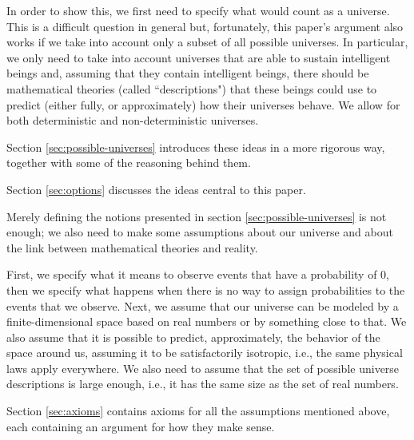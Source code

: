 \documentclass[a4paper
,draft
]{article}
\newcommand{\ghilimele}[1]{``#1"}
\begin{document}
In order to show this, we first need to specify what would count as a universe.
This is a difficult question in general but, fortunately, this paper's argument
also works if we take into account only a subset of all possible universes.
In particular, we only need to take into account universes that are able
to sustain intelligent beings
and, assuming that they contain intelligent beings, there should be mathematical
theories (called \ghilimele{descriptions}) that these beings could use to
predict (either fully, or approximately) how their universes behave.
We allow for both deterministic and non-deterministic universes.

Section \ref{sec:possible-universes} introduces these ideas in a more
rigorous way, together with some of the reasoning behind them.

Section \ref{sec:options} discusses the ideas central to this paper.

Merely defining the notions presented in section \ref{sec:possible-universes}
is not enough;
we also need to make some assumptions about our universe and about
the link between mathematical theories and reality.

First, we specify what it means to observe events that have a probability of $0$,
then we specify what happens when there is no way to assign probabilities to
the events that we observe.
Next, we assume that our universe can be modeled by a finite-dimensional
space based on real numbers or by something close to that.
We also assume that it is possible to predict, approximately, the behavior of the space
around us, assuming it to be satisfactorily isotropic,
i.e., the same physical laws apply everywhere.
We also need to assume that the set of possible universe descriptions
is large enough, i.e., it has the same size as the set of real numbers.

Section \ref{sec:axioms} contains axioms for all the assumptions mentioned
above, each containing an argument for how they make sense.
\end{document}
